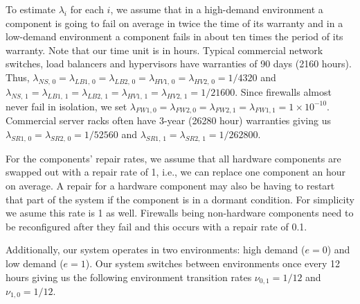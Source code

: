 \documentclass[12pt]{article}
\begin{document}
To estimate $\lambda_i$ for each $i$, we assume that in a high-demand
environment a component is going to fail on average in twice the time of its
warranty and in a low-demand environment a component fails in about ten times
the period of its warranty. Note that our time unit is in hours. Typical
commercial network switches, load balancers and hypervisors have warranties of
90 days (2160 hours). Thus, $\lambda_{NS, \, 0} = \lambda_{LB1, \, 0} =
\lambda_{LB2, \, 0} = \lambda_{HV1, \, 0} = \lambda_{HV2, \, 0} =
1 / 4320$ and $\lambda_{NS, \, 1} = \lambda_{LB1, \, 1} = \lambda_{LB2,
\, 1} = \lambda_{HV1, \, 1} = \lambda_{HV2, \, 1} = 1 / 21600$. Since
firewalls almost never fail in isolation, we set $\lambda_{FW1, 0} =
\lambda_{FW2, 0} = \lambda_{FW2, 1} = \lambda_{FW1, 1} = 1 \times 10^{-10}$.
Commercial server racks often have 3-year (26280 hour) warranties giving us
$\lambda_{SR1, \, 0} = \lambda_{SR2, \, 0} = 1 / 52560$ and
$\lambda_{SR1, \, 1} = \lambda_{SR2, \, 1} = 1 / 262800$.

For the components' repair rates, we assume that all hardware components are
swapped out with a repair rate of 1, i.e., we can replace one component an
hour on average. A repair for a hardware component may also be having to
restart that part of the system if the component is in a dormant condition.
For simplicity we asume this rate is 1 as well. Firewalls being non-hardware
components need to be reconfigured after they fail and this occurs with a
repair rate of 0.1.

Additionally, our system operates in two environments: high demand ($e = 0$)
and low demand ($e = 1$). Our system switches between environments once every
12 hours giving us the following environment transition rates $\nu_{0, 1} = 1
/ 12$ and $\nu_{1, 0} = 1 / 12$.



\end{document}
